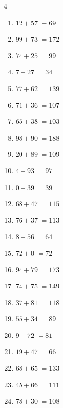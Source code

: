 \begin{multicols}{4}
\begin{enumerate}
  \item $12+57$
        $=69$

  \item $99+73$
        $=172$

  \item $74+25$
        $=99$

  \item $7+27$
        $=34$

  \item $77+62$
        $=139$

  \item $71+36$
        $=107$

  \item $65+38$
        $=103$

  \item $98+90$
        $=188$

  \item $20+89$
        $=109$

  \item $4+93$
        $=97$

  \item $0+39$
        $=39$

  \item $68+47$
        $=115$

  \item $76+37$
        $=113$

  \item $8+56$
        $=64$

  \item $72+0$
        $=72$

  \item $94+79$
        $=173$

  \item $74+75$
        $=149$

  \item $37+81$
        $=118$

  \item $55+34$
        $=89$

  \item $9+72$
        $=81$

  \item $19+47$
        $=66$

  \item $68+65$
        $=133$

  \item $45+66$
        $=111$

  \item $78+30$
        $=108$


\end{enumerate}
\end{multicols}
